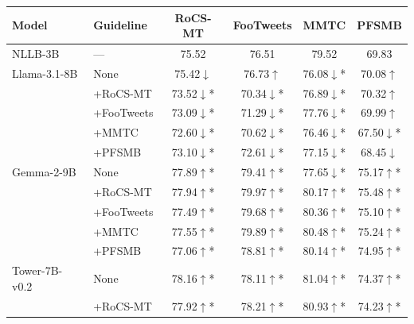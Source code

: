\begin{tabular}{llcccc}
\toprule
Model & Guideline & RoCS-MT & FooTweets & MMTC & PFSMB \\
\midrule
NLLB-3B & — & 75.52 & 76.51 & 79.52 & 69.83 \\
Llama-3.1-8B & None & 75.42\colorbox{myred}{$\downarrow$} & 76.73\colorbox{mygreen}{$\uparrow$} & 76.08\colorbox{myred}{$\downarrow$}* & 70.08\colorbox{mygreen}{$\uparrow$} \\
 & +RoCS-MT & 73.52\colorbox{myred}{$\downarrow$}* & 70.34\colorbox{myred}{$\downarrow$}* & 76.89\colorbox{myred}{$\downarrow$}* & 70.32\colorbox{mygreen}{$\uparrow$} \\
 & +FooTweets & 73.09\colorbox{myred}{$\downarrow$}* & 71.29\colorbox{myred}{$\downarrow$}* & 77.76\colorbox{myred}{$\downarrow$}* & 69.99\colorbox{mygreen}{$\uparrow$} \\
 & +MMTC & 72.60\colorbox{myred}{$\downarrow$}* & 70.62\colorbox{myred}{$\downarrow$}* & 76.46\colorbox{myred}{$\downarrow$}* & 67.50\colorbox{myred}{$\downarrow$}* \\
 & +PFSMB & 73.10\colorbox{myred}{$\downarrow$}* & 72.61\colorbox{myred}{$\downarrow$}* & 77.15\colorbox{myred}{$\downarrow$}* & 68.45\colorbox{myred}{$\downarrow$} \\
Gemma-2-9B & None & 77.89\colorbox{mygreen}{$\uparrow$}* & 79.41\colorbox{mygreen}{$\uparrow$}* & 77.65\colorbox{myred}{$\downarrow$}* & 75.17\colorbox{mygreen}{$\uparrow$}* \\
 & +RoCS-MT & 77.94\colorbox{mygreen}{$\uparrow$}* & 79.97\colorbox{mygreen}{$\uparrow$}* & 80.17\colorbox{mygreen}{$\uparrow$}* & 75.48\colorbox{mygreen}{$\uparrow$}* \\
 & +FooTweets & 77.49\colorbox{mygreen}{$\uparrow$}* & 79.68\colorbox{mygreen}{$\uparrow$}* & 80.36\colorbox{mygreen}{$\uparrow$}* & 75.10\colorbox{mygreen}{$\uparrow$}* \\
 & +MMTC & 77.55\colorbox{mygreen}{$\uparrow$}* & 79.89\colorbox{mygreen}{$\uparrow$}* & 80.48\colorbox{mygreen}{$\uparrow$}* & 75.24\colorbox{mygreen}{$\uparrow$}* \\
 & +PFSMB & 77.06\colorbox{mygreen}{$\uparrow$}* & 78.81\colorbox{mygreen}{$\uparrow$}* & 80.14\colorbox{mygreen}{$\uparrow$}* & 74.95\colorbox{mygreen}{$\uparrow$}* \\
Tower-7B-v0.2 & None & 78.16\colorbox{mygreen}{$\uparrow$}* & 78.11\colorbox{mygreen}{$\uparrow$}* & 81.04\colorbox{mygreen}{$\uparrow$}* & 74.37\colorbox{mygreen}{$\uparrow$}* \\
 & +RoCS-MT & 77.92\colorbox{mygreen}{$\uparrow$}* & 78.21\colorbox{mygreen}{$\uparrow$}* & 80.93\colorbox{mygreen}{$\uparrow$}* & 74.23\colorbox{mygreen}{$\uparrow$}* \\

\end{tabular}
